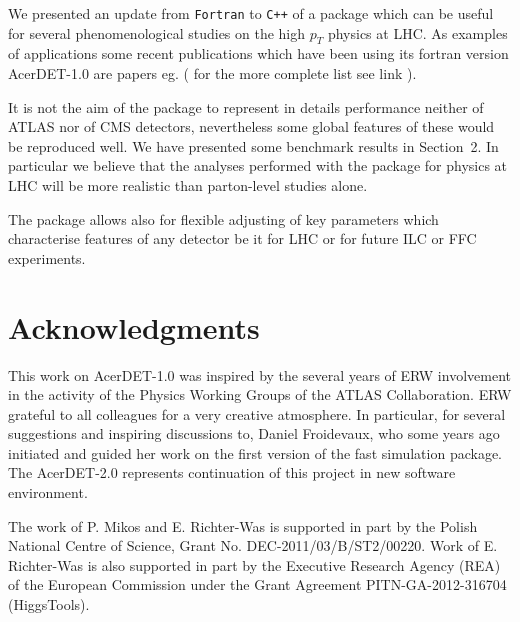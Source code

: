 We presented an update from {\tt Fortran} to {\tt C++} of a package which can be 
useful for several phenomenological studies on the high $p_T$ physics at LHC.
As examples of applications some recent publications which have been using
its fortran version AcerDET-1.0 \cite{AcerDET-1.0} are papers eg. 
\cite{Nagata2015, Schaetzel2014, Choi2012, Aguilar-Saavedra2012}
( for the more complete list see link \cite{AcerDET-1.0-citations} ). 

It is not the aim of the package to represent in details performance
neither of ATLAS nor of CMS detectors, nevertheless some global features
of these would be reproduced well. We have presented some benchmark results
in Section~2. In particular we believe that the
analyses performed with the package for physics at LHC will be more
realistic than parton-level studies alone.

The package allows also for flexible 
adjusting of key parameters which characterise features of any
detector be it for LHC or for future ILC or FFC experiments. 


\section*{Acknowledgments}

This work on AcerDET-1.0 was inspired by the several years of ERW involvement in the activity 
of the  Physics Working Groups of the ATLAS Collaboration.
ERW  grateful to all colleagues for a very creative atmosphere.
In particular, for several suggestions and inspiring discussions to,
Daniel Froidevaux, who  some years ago initiated and guided 
her work on the first version of the fast simulation package. The AcerDET-2.0 represents 
continuation of this project in new software environment.

The work of P. Mikos and E. Richter-Was is supported in part by the Polish National 
Centre of Science, Grant No. DEC-2011/03/B/ST2/00220. 
Work of E. Richter-Was is also supported  in part by  the Executive Research Agency (REA) 
of the European Commission under the Grant Agreement PITN-GA-2012-316704 (HiggsTools).

